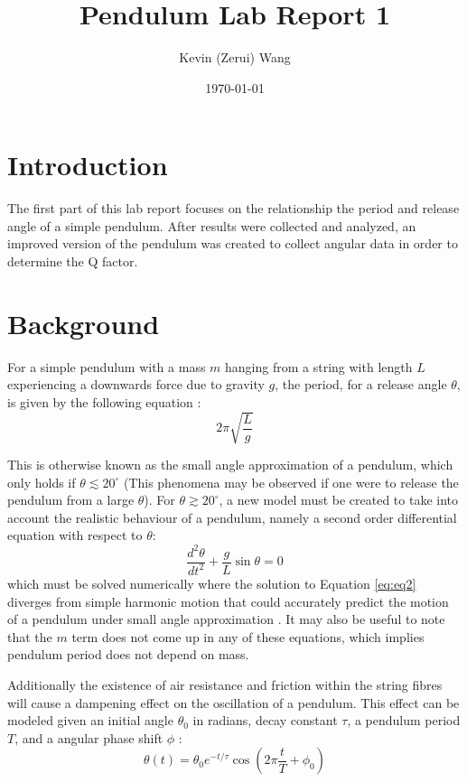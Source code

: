 \documentclass[12pt]{article}
\title{Pendulum Lab Report 1}
\author{Kevin (Zerui) Wang}
\date{\today}
\begin{document}

\maketitle


\section{Introduction}
The first part of this lab report focuses on the relationship the period and release angle of a simple pendulum. After results were collected and analyzed, an improved version of the pendulum was created to collect angular data in order to determine the Q factor.

\section{Background} \label{Background}
For a simple pendulum with a mass $m$ hanging from a string with length $L$ experiencing a downwards force due to gravity $g$, the period, for a release angle $\theta$, is given by the following equation \cite{the-simple-pendulum}:
\begin{equation} \label{eq:eq1}
    2\pi \sqrt{\frac{L}{g}}
\end{equation}

This is otherwise known as the small angle approximation of a pendulum, which only holds if $\theta \lesssim 20^{\circ}$ \cite{the-simple-pendulum} (This phenomena may be observed if one were to release the pendulum from a large $\theta$). For $\theta \gtrsim 20^{\circ}$, a new model must be created to take into account the realistic behaviour of a pendulum, namely a second order differential equation with respect to $\theta$:
\begin{equation} \label{eq:eq2}
    \frac{d^2\theta}{dt^2} + \frac{g}{L}\sin{\theta} = 0
\end{equation}
which must be solved numerically where the solution to Equation \ref{eq:eq2} diverges from simple harmonic motion that could accurately predict the motion of a pendulum under small angle approximation \cite{the-simple-pendulum}. It may also be useful to note that the $m$ term does not come up in any of these equations, which implies pendulum period does not depend on mass.

Additionally the existence of air resistance and friction within the string fibres will cause a dampening effect on the oscillation of a pendulum. This effect can be modeled given an initial angle $\theta_0$ in radians, decay constant $\tau$, a pendulum period $T$, and a angular phase shift $\phi$ \cite{damped-oscillations}:
\begin{equation}
    \theta(t) = \theta_0 e^{-{t/\tau}} \cos\left(2\pi\frac{t}{T} + \phi_0\right)
\end{equation}
\end{document}

